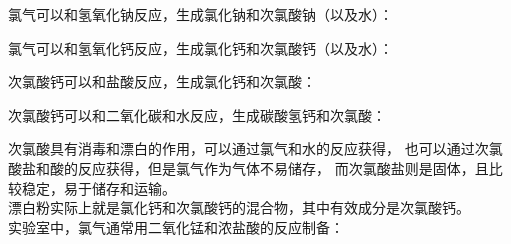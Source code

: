 \documentclass[UTF8]{ctexart}
\begin{document}
\newpage

    氯气可以和氢氧化钠反应，生成氯化钠和次氯酸钠（以及水）：
    \begin{center}
    \end{center}
    \vspace{5pt}
    氯气可以和氢氧化钙反应，生成氯化钙和次氯酸钙（以及水）：
    \begin{center}
    \end{center}
    \vspace{5pt}
    次氯酸钙可以和盐酸反应，生成氯化钙和次氯酸：
    \begin{center}
    \end{center}
    \vspace{5pt}
    次氯酸钙可以和二氧化碳和水反应，生成碳酸氢钙和次氯酸：
    \begin{center}
    \end{center}
    \vspace{5pt}
    次氯酸具有消毒和漂白的作用，可以通过氯气和水的反应获得，
    也可以通过次氯酸盐和酸的反应获得，但是氯气作为气体不易储存，
    而次氯酸盐则是固体，且比较稳定，易于储存和运输。\\[3mm]
    漂白粉实际上就是氯化钙和次氯酸钙的混合物，其中有效成分是次氯酸钙。\\[5mm]
    实验室中，氯气通常用二氧化锰和浓盐酸的反应制备：
    \begin{center}
    \end{center}
\end{document}
